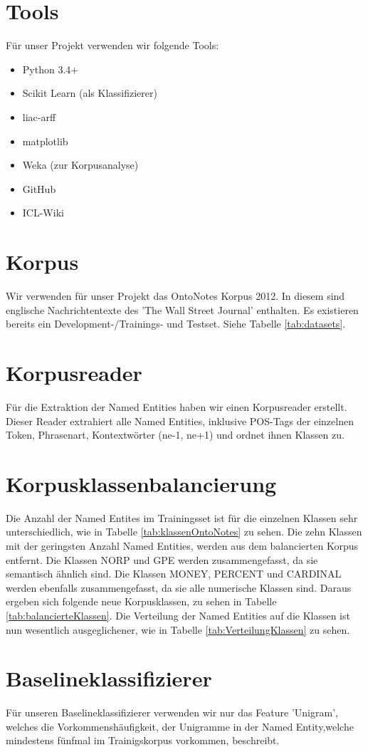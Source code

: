 \documentclass[a4paper, 11pt]{article}
\begin{document}
\section{Tools}
Für unser Projekt verwenden wir folgende Tools:
\begin{itemize}
\item Python 3.4+
\item Scikit Learn (als Klassifizierer)
\item liac-arff
\item matplotlib
\item Weka (zur Korpusanalyse)
\item GitHub
\item ICL-Wiki
\end{itemize}
\section{Korpus}
Wir verwenden für unser Projekt das OntoNotes Korpus 2012. In diesem sind englische Nachrichtentexte des 'The Wall Street Journal' enthalten. Es existieren bereits ein Development-/Trainings- und Testset. Siehe Tabelle \ref{tab:datasets}.
\section{Korpusreader}
Für die Extraktion der Named Entities haben wir einen Korpusreader erstellt. Dieser Reader extrahiert alle Named Entities, inklusive POS-Tags der einzelnen Token, Phrasenart, Kontextwörter (ne-1, ne+1) und ordnet ihnen Klassen zu.
\section{Korpusklassenbalancierung}
Die Anzahl der Named Entites im Trainingsset ist für die einzelnen Klassen sehr unterschiedlich, wie in Tabelle \ref{tab:klassenOntoNotes} zu sehen. Die zehn Klassen mit der geringsten Anzahl Named Entities, werden aus dem balancierten Korpus entfernt. Die Klassen NORP und GPE werden zusammengefasst, da sie semantisch ähnlich sind. Die Klassen MONEY, PERCENT und CARDINAL werden ebenfalls zusammengefasst, da sie alle numerische Klassen sind.
Daraus ergeben sich folgende neue Korpusklassen, zu sehen in Tabelle \ref{tab:balancierteKlassen}.
Die Verteilung der Named Entities auf die Klassen ist nun wesentlich ausgeglichener, wie in Tabelle \ref{tab:VerteilungKlassen} zu sehen.
\section{Baselineklassifizierer}
Für unseren Baselineklassifizierer verwenden wir nur das Feature 'Unigram', welches die Vorkommenshäufigkeit, der Unigramme in der Named Entity,welche mindestens fünfmal im Trainigskorpus vorkommen, beschreibt.
\end{document}
